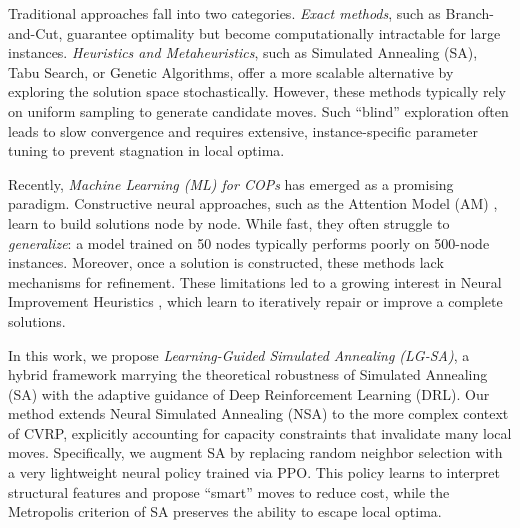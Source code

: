 \documentclass[letterpaper]{article} %
\begin{document}
Traditional approaches fall into two categories. \textit{Exact methods}, such as Branch-and-Cut, guarantee optimality but become computationally intractable for large instances. \textit{Heuristics and Metaheuristics}, such as Simulated Annealing (SA), Tabu Search, or Genetic Algorithms, offer a more scalable alternative by exploring the solution space stochastically. However, these methods typically rely on uniform sampling to generate candidate moves. Such ``blind'' exploration often leads to slow convergence and requires extensive, instance-specific parameter tuning to prevent stagnation in local optima.

Recently, \textit{Machine Learning (ML) for COPs} has emerged as a promising paradigm. Constructive neural approaches, such as the Attention Model (AM) \cite{kool_attention_2019}, learn to build solutions node by node. While fast, they often struggle to \textit{generalize}: a model trained on 50 nodes typically performs poorly on 500-node instances. Moreover, once a solution is constructed, these methods lack mechanisms for refinement. These limitations led to a growing interest in Neural Improvement Heuristics \cite{wu_learning_2022,garcia-torres_combining_2022}, which learn to iteratively repair or improve a complete solutions.

In this work, we propose \textit{Learning-Guided Simulated Annealing (LG-SA)}, a hybrid framework marrying the theoretical robustness of Simulated Annealing (SA) with the adaptive guidance of Deep Reinforcement Learning (DRL). Our method extends Neural Simulated Annealing (NSA) \citep{correia_neural_2023} to the more complex context of CVRP, explicitly accounting for capacity constraints that invalidate many local moves. Specifically, we augment SA by replacing random neighbor selection with a very lightweight neural policy trained via PPO. This policy learns to interpret structural features and propose ``smart'' moves to reduce cost, while the Metropolis criterion of SA preserves the ability to escape local optima.
\end{document}
